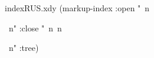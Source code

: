  
 
  
\begin{filecontents*}{indexRUS.xdy}
(markup-index :open  "~n
\begin{theindex}
  \providecommand*\lettergroupDefault[1]{}
  \providecommand*\lettergroup[1]{%
    \textsf{#1}
    \nopagebreak
  }
  ~n"
  :close "~n~n\end{theindex}~n"
:tree)
\end{filecontents*}

 
